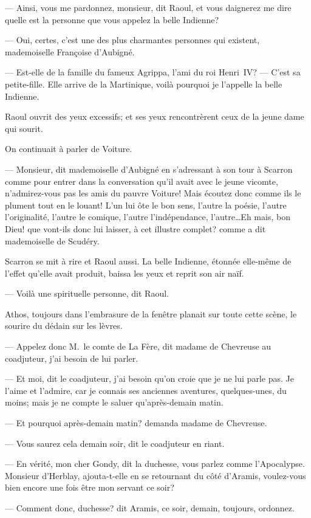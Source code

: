 — Ainsi, vous me pardonnez, monsieur, dit Raoul, et vous daignerez me dire quelle est la personne que vous appelez la belle Indienne?

— Oui, certes, c'est une des plus charmantes personnes qui existent, mademoiselle Françoise d'Aubigné.

— Est-elle de la famille du fameux Agrippa, l'ami du roi Henri~IV?
— C'est sa petite-fille. Elle arrive de la Martinique, voilà pourquoi je l'appelle la belle Indienne.

Raoul ouvrit des yeux excessifs; et ses yeux rencontrèrent ceux de la jeune dame qui sourit.

On continuait à parler de Voiture.

— Monsieur, dit mademoiselle d'Aubigné en s'adressant à son tour à Scarron comme pour entrer dans la conversation qu'il avait avec le jeune vicomte, n'admirez-vous pas les amis du pauvre Voiture! Mais écoutez donc comme ils le plument tout en le louant! L'un lui ôte le bon sens, l'autre la poésie, l'autre l'originalité, l'autre le comique, l'autre l'indépendance, l'autre\dots Eh mais, bon Dieu! que vont-ils donc lui laisser, à cet illustre complet? comme a dit mademoiselle de Scudéry.

Scarron se mit à rire et Raoul aussi. La belle Indienne, étonnée elle-même de l'effet qu'elle avait produit, baissa les yeux et reprit son air naïf.

— Voilà une spirituelle personne, dit Raoul.

Athos, toujours dans l'embrasure de la fenêtre planait sur toute cette scène, le sourire du dédain sur les lèvres.

— Appelez donc M.~le comte de La Fère, dit madame de Chevreuse au coadjuteur, j'ai besoin de lui parler.

— Et moi, dit le coadjuteur, j'ai besoin qu'on croie que je ne lui parle pas. Je l'aime et l'admire, car je connais ses anciennes aventures, quelques-unes, du moins; mais je ne compte le saluer qu'après-demain matin.

— Et pourquoi après-demain matin? demanda madame de Chevreuse.

— Vous saurez cela demain soir, dit le coadjuteur en riant.

— En vérité, mon cher Gondy, dit la duchesse, vous parlez comme l'Apocalypse. Monsieur d'Herblay, ajouta-t-elle en se retournant du côté d'Aramis, voulez-vous bien encore une fois être mon servant ce soir?

— Comment donc, duchesse? dit Aramis, ce soir, demain, toujours, ordonnez.

